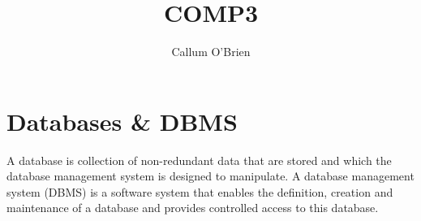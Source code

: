 \documentclass{article}
\begin{document}
\title{COMP3}
\author{Callum O'Brien}
\maketitle
\tableofcontents

\newpage

\section{Databases \& DBMS}

A database is collection of non-redundant data that are stored and which the
database management system is designed to manipulate. A database management
system (DBMS) is a software system that enables the definition, creation and
maintenance of a database and provides controlled access to this database.
\end{document}
